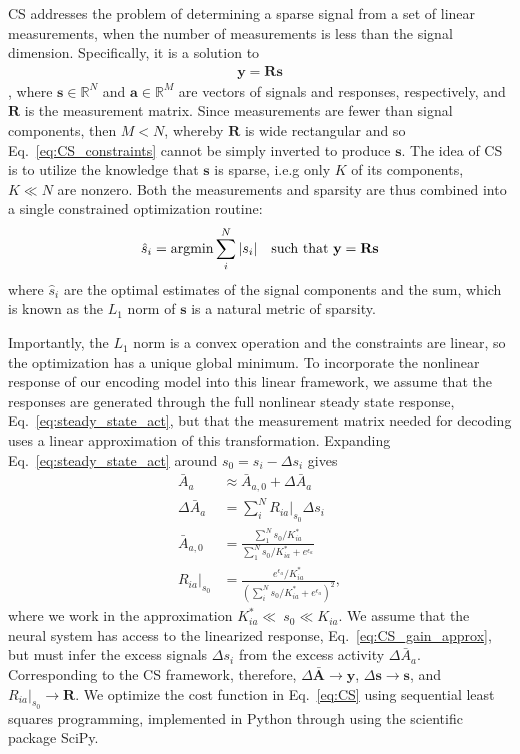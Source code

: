 CS addresses the problem of determining a sparse signal from a set of linear measurements, when the number of measurements is less than the signal dimension. Specifically, it is a solution to 
\begin{align}
\mathbf y = \mathbf R\mathbf s
\label{eq:CS_constraints}
\end{align}, where $\mathbf s \in \mathbb{R}^N$ and $\mathbf a\in \mathbb{R}^M$ are vectors of signals and responses, respectively, and $\mathbf R$ is the measurement matrix. Since measurements are fewer than signal components, then $M < N$, whereby $\mathbf R$ is wide rectangular and so Eq.~\ref{eq:CS_constraints} cannot be simply inverted to produce $\mathbf s$. The idea of CS is to utilize the knowledge that $\mathbf s$ is sparse, i.e.g only $K$ of its components, $K \ll N$ are nonzero. Both the measurements and sparsity are thus combined into a single constrained optimization routine:
\begin{align}
\hat s_i = \textup{argmin} \sum_i^N |s_i| \quad \textup{such that } \mathbf y = \mathbf R\mathbf s
\label{eq:CS}
\end{align}
where $\hat s_i$ are the optimal estimates of the signal components and the sum, which is known as the $L_1$ norm of $\mathbf s$ is a natural metric of sparsity. 

Importantly, the $L_1$ norm is a convex operation and the constraints are linear, so the optimization has a unique global minimum. To incorporate the nonlinear response of our encoding model into this linear framework, we assume that the responses are generated through the full nonlinear steady state response, Eq.~\ref{eq:steady_state_act}, but that the measurement matrix needed for decoding uses a linear approximation of this transformation.  Expanding Eq.~\ref{eq:steady_state_act} around $s_0 = s_i - \Delta s_i$ gives
\begin{align}
\bar A_a &\approx \bar A_{a, 0} + \Delta \bar{A}_a \label{eq:CS_act_approx} \\
\Delta \bar{A}_a &= \sum_i^NR_{ia}\big|_{s_0}\Delta s_i \label{eq:CS_dAct_approx}\\
\bar A_{a, 0} &= \frac{\sum_1^N s_0/K_{ia}^*}{\sum_1^N s_0/K_{ia}^* + e^{\epsilon_a}} \label{eq:CS_act0_approx} \\
R_{ia}\big|_{s_0} &=  \frac{e^{\epsilon_a}/K_{ia}^*}{(\sum_i^Ns_0/K_{ia}^* + e^{\epsilon_a})^2},
\label{eq:CS_gain_approx}
\end{align}
where we work in the approximation $K^*_{ia} \ll~s_0 \ll K_{ia}$. We assume that the neural system has access to the linearized response, Eq.~\ref{eq:CS_gain_approx}, but must infer the excess signals $\Delta s_i$ from the excess activity $\Delta \bar A_a$. Corresponding to the CS framework, therefore, $\Delta \mathbf {\bar A} \rightarrow \mathbf y$, $\Delta \mathbf s \rightarrow \mathbf s$, and $R_{ia}\big|_{s_0} \rightarrow \mathbf R$. We optimize the cost function in Eq.~\ref{eq:CS} using sequential least squares programming, implemented in Python through using the scientific package SciPy.

